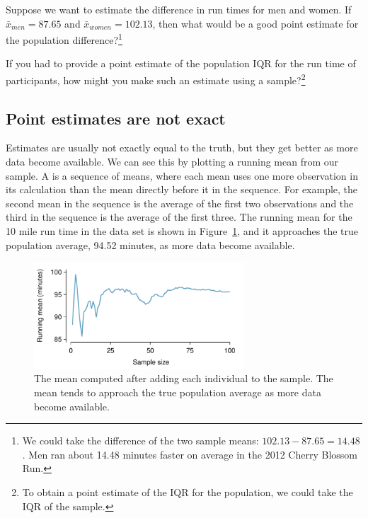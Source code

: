 \begin{exercise} \label{pointEstimateOfDifferentNetTimesBetweenGender}
Suppose we want to estimate the difference in run times for men and women. If $\bar{x}_{men} = 87.65$ and $\bar{x}_{women} = 102.13$, then what would be a good point estimate for the population difference?\footnote{We could take the difference of the two sample means: $102.13 - 87.65 = 14.48$. Men ran about 14.48 minutes faster on average in the 2012 Cherry Blossom Run.}
\end{exercise}

\begin{exercise}
If you had to provide a point estimate of the population IQR for the run time of participants, how might you make such an estimate using a sample?\footnote{To obtain a point estimate of the IQR for the population, we could take the IQR of the sample.}


\end{exercise}

\subsection{Point estimates are not exact}

Estimates are usually not exactly equal to the truth, but they get better as more data become available. We can see this by plotting a running mean from our  sample. A  is a sequence of means, where each mean uses one more observation in its calculation than the mean directly before it in the sequence. For example, the second mean in the sequence is the average of the first two observations and the third in the sequence is the average of the first three. The running mean for the 10 mile run time in the  data set is shown in Figure~\ref{netTimeRunningMean}, and it approaches the true population average, 94.52 minutes, as more data become available.

\begin{figure}
   \centering
   \includegraphics[width=0.7\textwidth]{04/figures/netTimeRunningMean/netTimeRunningMean}
   \caption{The mean computed after adding each individual to the sample. The mean tends to approach the true population average as more data become available.}
   \label{netTimeRunningMean}
\end{figure}

